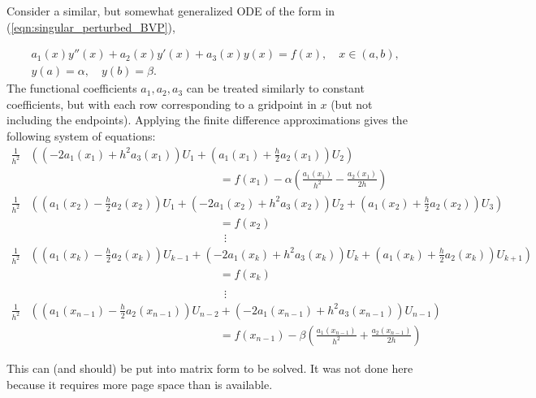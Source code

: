 Consider a similar, but somewhat generalized ODE of the form in (\ref{eqn:singular_perturbed_BVP}),

\begin{align*}
	&{ } a_1(x)y''(x) +a_2(x)y'(x) +a_3(x)y(x) = f(x), \quad x \in (a,b),\\
	&{ } y(a) = \alpha, \quad y(b) = \beta.
\end{align*}
The functional coefficients $a_1, a_2, a_3$ can be treated similarly to constant coefficients, but with each row corresponding to a gridpoint in $x$ (but not including the endpoints).
Applying the finite difference approximations gives the following system of equations:
\begin{align*}
\frac{1}{h^2} & \left( \left(-2a_1(x_1) + h^2a_3(x_1)\right)U_1 + \left(a_1(x_1) + \frac{h}{2}a_2(x_1)\right)U_2  \right) \\
&\hspace{7cm} = f(x_1) - \alpha \left(\frac{a_1(x_1)}{h^2}- \frac{a_2(x_1)}{2h}\right) \\
\frac{1}{h^2} & \left( \left(a_1(x_2) - \frac{h}{2}a_2(x_2)\right) U_1 + \left(- 2a_1(x_2) + h^2a_3(x_2)\right)U_2  + \left(a_1(x_2) + \frac{h}{2}a_2(x_2) \right)U_3 \right) \\
&\hspace{7cm}= f(x_2)
\\
&\hspace{7cm}~~\vdots
\\
\frac{1}{h^2}& \left( \left(a_1(x_k) - \frac{h}{2}a_2(x_k)\right) U_{k-1} + \left(- 2a_1(x_k) + h^2a_3(x_k)\right)U_k + \left(a_1(x_k) + \frac{h}{2}a_2(x_k) \right)U_{k+1} \right) \\
&\hspace{7cm}= f(x_k) \\
\end{align*}\begin{align*}
&\hspace{7cm}~~\vdots \\
\frac{1}{h^2}& \left( \left(a_1(x_{n-1}) - \frac{h}{2}a_2(x_{n-1})\right) U_{n-2} + \left(- 2a_1(x_{n-1}) + h^2 a_3(x_{n-1})\right)U_{n-1} \right) \\
&\hspace{7cm}= f(x_{n-1}) 
- \beta\left(
\frac{a_1(x_{n-1})}{h^2}+ \frac{a_2(x_{n-1})}{2h}
\right)
\end{align*}

This can (and should) be put into matrix form to be solved.
It was not done here because it requires more page space than is available.

